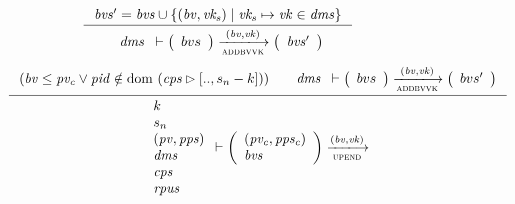 \begin{figure}[htb]
  \begin{equation}
    \label{eq:rule:addbvvk}
    \inference
    {
      \var{bvs'} = \var{bvs} \cup
      \{ (\var{bv}, \var{vk_s}) \mid \var{vk_s} \mapsto \var{vk} \in \var{dms} \}
    }
    {
      {
        \begin{array}{l}
          \var{dms}
        \end{array}
      }
      \vdash
      {
        \left(
          \begin{array}{l}
            bvs
          \end{array}
        \right)
      }
      \trans{addbvvk}{(\var{bv}, \var{vk})}
      {
        \left(
          \begin{array}{l}
            \var{bvs'}
          \end{array}
        \right)
      }
    }
  \end{equation}
  \nextdef
  \begin{equation}
    \label{eq:rule:up-adopted}
    \inference
    {
      (\var{bv} \leq \var{pv_c} \vee \var{pid} \notin \dom~(\var{cps} \restrictrange [.., s_n - k]))
      &
      {
        \begin{array}{l}
          \var{dms}
        \end{array}
      }
      \vdash
      {
        \left(
          \begin{array}{l}
            bvs
          \end{array}
        \right)
      }
      \trans{addbvvk}{(\var{bv}, \var{vk})}
      {
        \left(
          \begin{array}{l}
            bvs'
          \end{array}
        \right)
      }
    }
    {
      {
        \begin{array}{l}
          k\\
          s_n\\
          (\var{pv}, \var{pps})\\
          \var{dms}\\
          \var{cps}\\
          \var{rpus}
        \end{array}
      }
      \vdash
      {
        \left(
          \begin{array}{l}
            (\var{pv_c}, \var{pps_c})\\
            \var{bvs}
          \end{array}
        \right)
      }
      \trans{upend}{(\var{bv}, \var{vk})}
}
\end{equation}
\end{figure}
